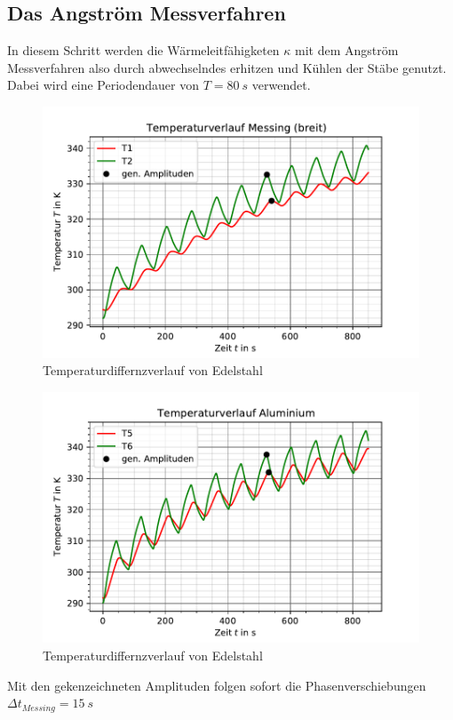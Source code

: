 \subsection{Das Angström Messverfahren}
In diesem Schritt werden die Wärmeleitfähigketen $\kappa$ mit dem Angström Messverfahren also durch
abwechselndes erhitzen und Kühlen der Stäbe genutzt. Dabei wird eine Periodendauer von $T=\SI[]{80}[]{s}$
verwendet.
\begin{figure}
    \centering
    \includegraphics{wellemessing.pdf}
    \caption{Temperaturdiffernzverlauf von Edelstahl}
    \label{fig:differenz}
  \end{figure}
  \begin{figure}
    \centering
    \includegraphics{wellenalu.pdf}
    \caption{Temperaturdiffernzverlauf von Edelstahl}
    \label{fig:differenz}
  \end{figure}
  Mit den gekenzeichneten Amplituden folgen sofort die Phasenverschiebungen $\Delta t_{Messing}=\SI[]{15}[]{s}$ 
